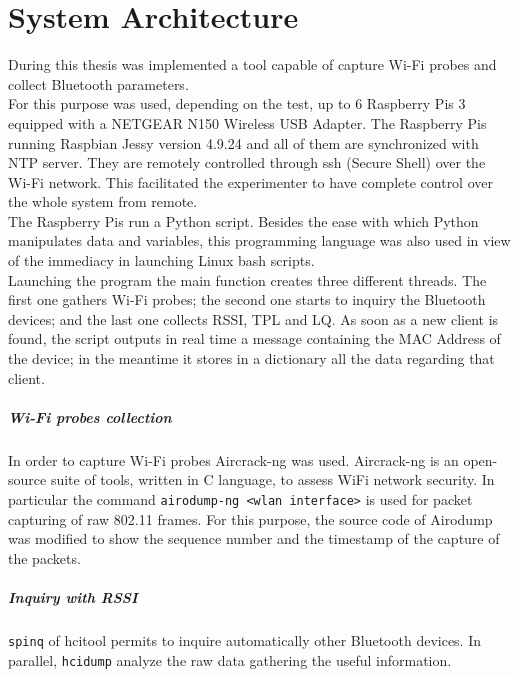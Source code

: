 \chapter{System Architecture}
\label{Chapter 4}
\thispagestyle{empty}
During this thesis was implemented a tool capable of capture Wi-Fi probes and collect Bluetooth parameters.\\
For this purpose was used, depending on the test, up to 6 Raspberry Pis 3 equipped with a NETGEAR N150 Wireless USB Adapter. The Raspberry Pis running Raspbian Jessy version 4.9.24 and all of them are synchronized with NTP server. They are remotely controlled through ssh (Secure Shell) over the Wi-Fi network. This facilitated the experimenter to have complete control over the whole system from remote.\\
\linebreak
The Raspberry Pis run a Python script. Besides the ease with which Python manipulates data and variables, this programming language was also used in view of the immediacy in launching Linux bash scripts.\\
Launching the program the main function creates three different threads. The first one gathers Wi-Fi probes; the second one starts to inquiry the Bluetooth devices; and the last one collects RSSI, TPL and LQ. As soon as a new client is found, the script outputs in real time a message containing the MAC Address of the device; in the meantime it stores in a dictionary all the data regarding that client.

\paragraph{Wi-Fi probes collection}
In order to capture Wi-Fi probes Aircrack-ng was used. Aircrack-ng is an open-source suite of tools, written in C language, to assess WiFi network security. In particular the command \texttt{airodump-ng \textless wlan interface\textgreater} is used for packet capturing of raw 802.11 frames. For this purpose, the source code of Airodump was modified to show the sequence number and the timestamp of the capture of the packets.

\paragraph{Inquiry with RSSI}
\texttt{spinq} of hcitool permits to inquire automatically other Bluetooth devices. In parallel, \texttt{hcidump} analyze the raw data gathering the useful information.

